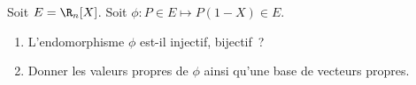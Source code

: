 \begin{enonce}
\begin{exercise}[ID={RMS124 E646 Mines-Ponts PSI},subtitle={},tags={}]
Soit $E=\R_n[X]$.
Soit $\phi : P\in E\mapsto P(1-X) \in E$.
\begin{enumerate}
  \item L'endomorphisme $\phi$ est-il injectif, bijectif~?
  \item Donner les valeurs propres de $\phi$ ainsi qu'une base de vecteurs propres.
\end{enumerate}
\end{exercise}
\begin{solution}
\end{solution}
\end{enonce}
